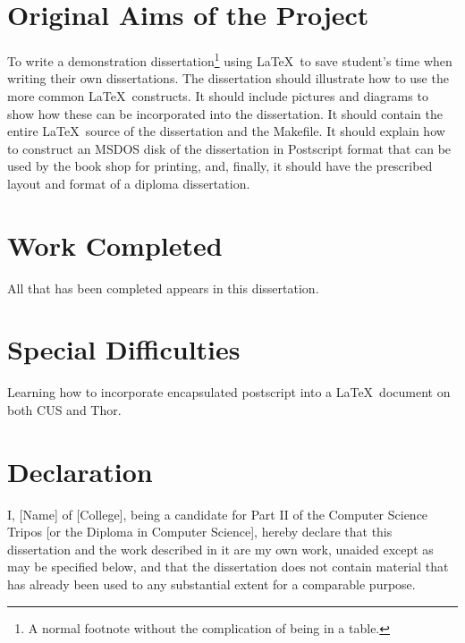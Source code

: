 \documentclass[12pt,twoside,notitlepage]{report}
\begin{document}
\section*{Original Aims of the Project}

To write a demonstration dissertation\footnote{A normal footnote without the
complication of being in a table.} using \LaTeX\ to save
student's time when writing their own dissertations. The dissertation
should illustrate how to use the more common \LaTeX\ constructs. It
should include pictures and diagrams to show how these can be
incorporated into the dissertation.  It should contain the entire
\LaTeX\ source of the dissertation and the Makefile.  It should
explain how to construct an MSDOS disk of the dissertation in
Postscript format that can be used by the book shop for printing, and,
finally, it should have the prescribed layout and format of a diploma
dissertation.


\section*{Work Completed}

All that has been completed appears in this dissertation.

\section*{Special Difficulties}

Learning how to incorporate encapsulated postscript into a \LaTeX\
document on both CUS and Thor.
 
\newpage
\section*{Declaration}

I, [Name] of [College], being a candidate for Part II of the Computer
Science Tripos [or the Diploma in Computer Science], hereby declare
that this dissertation and the work described in it are my own work,
unaided except as may be specified below, and that the dissertation
does not contain material that has already been used to any substantial
extent for a comparable purpose.

\bigskip
{}

\medskip
{}

\cleardoublepage

\tableofcontents

\listoffigures
\end{document}
